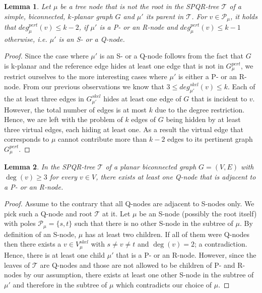 \documentclass[a4paper,twoside,11pt]{article}
\newtheorem{lemma}{Lemma}
\newcommand{\skel}[1]{G^\textit{skel}_{#1}}
\newcommand{\Vskel}[1]{V^\textit{skel}_{#1}}
\newcommand{\pert}[1]{G^\textit{pert}_{#1}}
\newcommand{\pdeg}[2]{\textit{deg}^{\textit{pert}}_{#1}(#2)}
\newcommand{\sdeg}[2]{\textit{deg}^{\textit{skel}}_{#1}(#2)}
\newcommand{\poles}[1]{\mathcal{P}_{#1}}
\begin{document}
\begin{lemma}
Let $\mu$ be a tree node that is not the root in the SPQR-tree
$\mathcal{T}$ of a simple, biconnected, $k$-planar graph $G$ and
$\mu'$ its parent in $\mathcal{T}$. For $v \in \poles{\mu}$, it
holds that $\pdeg{\mu}{v} \leq k-2$, if $\mu'$ is a P- or an R-node
and $\pdeg{\mu}{v} \leq k-1$ otherwise, i.e. $\mu'$ is an S- or a
Q-node. \label{lem:pdeg_bounds}
\end{lemma}
\begin{proof}
Since the case where $\mu'$ is an S- or a Q-node follows from the
fact that $G$ is k-planar and the reference edge hides at least
one edge that is not in $\pert{\mu}$, we restrict ourselves to the
more interesting cases where $\mu'$ is either a P- or an R-node.
From our previous observations we know that $3 \leq \sdeg{\mu'}{v}
\leq k$. Each of the at least three edges in $\skel{\mu'}$ hides at
least one edge of $G$ that is incident to $v$. However, the total
number of edges is at most $k$ due to the degree restriction. Hence,
we are left with the problem of $k$ edges of $G$ being hidden by at
least three virtual edges, each hiding at least one. As a result the
virtual edge that corresponds to $\mu$ cannot contribute more than
$k-2$ edges to its pertinent graph $\pert{\mu}$.
\end{proof}

\begin{lemma}
In the SPQR-tree $\mathcal{T}$ of a planar biconnected graph $G =
(V,E)$ with $\deg(v) \geq 3$ for every $v \in V$, there exists at
least one Q-node that is adjacent to a P- or an R-node.
\label{lem:pr_node}
\end{lemma}
\begin{proof}
Assume to the contrary that all Q-nodes are adjacent to S-nodes
only. We pick such a Q-node and root $\mathcal{T}$ at it. Let $\mu$
be an S-node (possibly the root itself) with poles $\mathcal{P}_\mu
= \{ s, t \}$ such that there is no other S-node in the subtree of
$\mu$. By definition of an S-node, $\mu$ has at least two children.
If all of them were Q-nodes then there exists a $v \in \Vskel{\mu}$
with $s \neq v \neq t$ and $\deg(v) = 2$; a contradiction. Hence,
there is at least one child $\mu'$ that is a P- or an R-node.
However, since the leaves of $\mathcal{T}$ are Q-nodes and those are
not allowed to be children of P- and R-nodes by our assumption,
there exists at least one other S-node in the subtree of $\mu'$ and
therefore in the subtree of $\mu$ which contradicts our choice of
$\mu$.
\end{proof}
\end{document}
